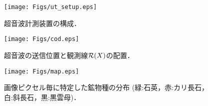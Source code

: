 \begin{figure}[t]
\begin{center}
\texttt{[image: Figs/ut\_setup.eps]}
\caption{ 超音波計測装置の構成． }
\label{fig:fig2}
\end{center}
\end{figure}
\begin{figure}[t]
\begin{center}
\texttt{[image: Figs/cod.eps]}
\caption{
	超音波の送信位置と観測線${\cal R}(X)$の配置．
}
\label{fig:fig3}
\end{center}
\end{figure}
\begin{figure}[t]
\begin{center}
\texttt{[image: Figs/map.eps]}
\caption{
	画像ピクセル毎に特定した鉱物種の分布
	(緑:石英，赤:カリ長石，白:斜長石，黒:黒雲母)．
}
\label{fig:fig4}
\end{center}
\end{figure}

